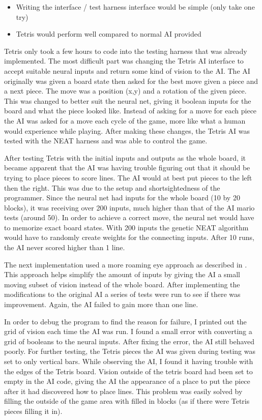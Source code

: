 \documentclass[12pt]{ucthesis} \newif\ifpdf \ifx\pdfoutput\undefined
\begin{document}
\begin{itemize}
\renewcommand{\labelitemi}{$\bullet$}
\item Writing the interface / test harness interface would be simple (only take one
try) 
\item Tetris would perform well compared to normal AI provided
\end{itemize}

Tetris only took a few hours to code into the testing harness that was already
implemented. The most difficult part was changing the Tetris AI interface to
accept suitable neural inputs and return some kind of vision to the AI. The AI
originally was given a board state then asked for the best move given a piece
and a next piece. The move was a position (x,y) and a rotation of the given
piece. This was changed to better suit the neural net, giving it boolean inputs
for the board and what the piece looked like. Instead of asking for a move for
each piece the AI was asked for a move each cycle of the game, more like what a
human would experience while playing. After making these changes, the Tetris AI
was tested with the NEAT harness and was able to control the game.

After testing Tetris with the initial inputs and outputs as the whole board, it
became apparent that the AI was having trouble figuring out that it should be
trying to place pieces to score lines. The AI would at best put pieces to the
left then the right. This was due to the setup and shortsightedness of the
programmer. Since the neural net had inputs for the whole board (10 by 20
blocks), it was receiving over 200 inputs, much higher than that of the AI mario
tests (around 50). In order to achieve a correct move, the neural net would have
to memorize exact board states. With 200 inputs the genetic NEAT algorithm would
have to randomly create weights for the connecting inputs. After 10 runs, the AI
never scored higher than 1 line.

The next implementation used a more roaming eye approach as described in
\cite{stanley:phd04}. This approach helps simplify the amount of inputs by
giving the AI a small moving subset of vision instead of the whole board. After
implementing the modifications to the original AI a series of tests were run to
see if there was improvement. Again, the AI failed to gain more than one line.

In order to debug the program to find the reason for failure, I printed out the
grid of vision each time the AI was run. I found a small error with converting a
grid of booleans to the neural inputs. After fixing the error, the AI still
behaved poorly. For further testing, the Tetris pieces the AI was given during testing
was set to only vertical bars. While observing the AI, I found it having trouble
with the edges of the Tetris board. Vision outside of the tetris board had been
set to empty in the AI code, giving the AI the appearance of a place to put the
piece after it had discovered how to place lines. This problem was easily solved
by filling the outside of the game area with filled in blocks (as if there were
Tetris pieces filling it in).
\end{document}
